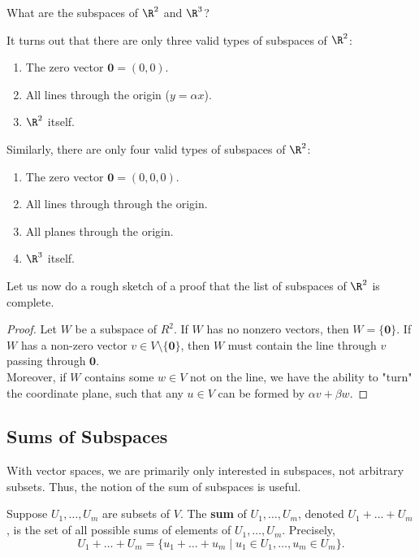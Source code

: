 \documentclass[math0540-lecture-notes.tex]{subfiles}
\begin{document}
\begin{example}
  What are the subspaces of $\R^2$ and $\R^3$?
\end{example}
\begin{solution}
  It turns out that there are only three valid types of subspaces of $ \R^2$:
  \begin{enumerate}
    \item The zero vector $\textbf{0}=(0,0)$.
    \item All lines through the origin ($y=\alpha x$).
    \item $\R^2$ itself.
  \end{enumerate}
  Similarly, there are only four valid types of subspaces of $\R^2$:
  \begin{enumerate}
    \item The zero vector $\textbf{0}=(0,0,0)$.
    \item All lines through through the origin.
    \item All planes through the origin.
    \item $\R^3$ itself.
  \end{enumerate}
\end{solution}
Let us now do a rough sketch of a proof that the list of subspaces of $\R^2$ is complete.
\begin{proof}[Proof]
  Let $W$ be a subspace of $ R^2$. If $W$ has no nonzero vectors, then $W=\{ \textbf{0} \}$. If
  $W$ has a non-zero vector  $v \in V\setminus \{ \textbf{0} \}$, then $W$ must contain the line
  through $v$ passing through  $ \textbf{0}$. \\
  Moreover, if $W$ contains some $w\in V$ not on the line, we have the ability to "turn" the
  coordinate plane, such that any $u\in V$ can be formed by $\alpha v + \beta w$.
\end{proof}


\subsection{Sums of Subspaces}

With vector spaces, we are primarily only interested in subspaces, not arbitrary subsets. Thus, the
notion of the sum of subspaces is useful.
\begin{definition}{}
  Suppose $ U_1,\ldots,U_m$ are subsets of $V$. The \textbf{sum} of $ U_1,\ldots,U_m$, denoted $
  U_1+\ldots+U_m$, is the set of all possible sums of elements of $ U_1,\ldots,U_m$. Precisely, \[
    U_1+\ldots+U_m = \{u_1+\ldots+u_m\mid u_1\in U_1, \ldots,u_m\in U_m \} 
  .\] 
\end{definition}
\end{document}
